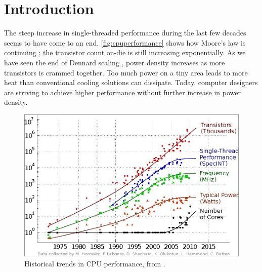 \chapter{Introduction}

The steep increase in single-threaded performance during the last few decades
seems to have come to an end. \autoref{fig:cpuperformance} shows how Moore's law
is continuing \cite{moore1965cramming, tanenbaum1984structured}; the transistor
count on-die is still increasing exponentially. As we have seen the end of
Dennard scaling \cite{dennard1974design,esmaeilzadeh2011dark}, power density
increases as more transistors is crammed together. Too much power on a tiny area
leads to more heat than conventional cooling solutions can dissipate. Today,
computer designers are striving to achieve higher performance without further
increase in power density.


\begin{figure}[bht]
\includegraphics[width=\textwidth]{figs/cpu-performance.png}
\caption{Historical trends in CPU performance, from \cite{salishan2011}.}
    \label{fig:cpuperformance}
\end{figure}










%
%


